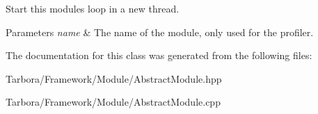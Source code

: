 Start this module\textquotesingle{}s loop in a new thread. 


\begin{DoxyParams}{Parameters}
{\em name} & The name of the module, only used for the profiler. \\
\hline
\end{DoxyParams}


The documentation for this class was generated from the following files\+:\begin{DoxyCompactItemize}
\item 
Tarbora/\+Framework/\+Module/Abstract\+Module.\+hpp\item 
Tarbora/\+Framework/\+Module/Abstract\+Module.\+cpp\end{DoxyCompactItemize}
